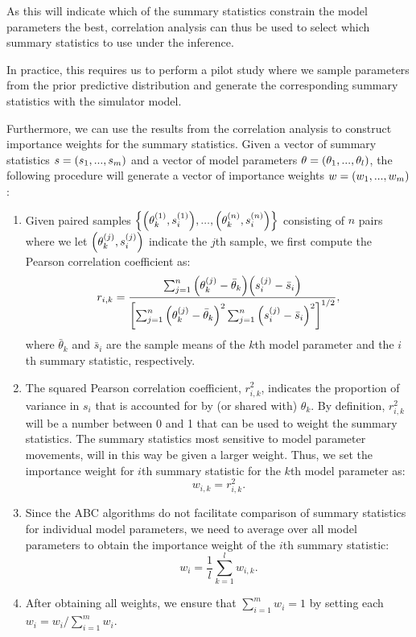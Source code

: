 As this will indicate which of the summary statistics constrain the model parameters the best, correlation analysis can thus be used to select which summary statistics to use under the inference. %

In practice, this requires us to perform a pilot study where we sample parameters from the prior predictive distribution and generate the corresponding summary statistics with the simulator model.  

Furthermore, we can use the results from the correlation analysis to construct importance weights for the summary statistics. Given a vector of summary statistics $s = \qty(s_1, ..., s_m)$ and a vector of model parameters $\theta = \qty(\theta_1, ..., \theta_l)$, the following procedure will generate a vector of importance weights $w = \qty(w_1, ..., w_m)$: 
\begin{enumerate}
    \item Given paired samples $\qty{\qty(\theta_k^{(1)}, s_i^{(1)}), ..., \qty(\theta_k^{(n)}, s_i^{(n)})}$ consisting of $n$ pairs where we let $\qty(\theta_k^{(j)}, s_i^{(j)})$ indicate the $j$th sample, we first compute the Pearson correlation coefficient as:
    \begin{equation*}
    r_{i, k} = \frac{\sum_{j=1}^n \qty(\theta_k^{(j)} - \bar{\theta}_k) \qty(s_i^{(j)} - \bar{s}_i)}{\qty[\sum_{j=1}^n \qty(\theta_k^{(j)} - \bar{\theta}_k )^2 \sum_{j=1}^n \qty(s_i^{(j)} - \bar{s}_i )^2 ]^{1/2}},
    \end{equation*}
    where $\bar{\theta}_k$ and $\bar{s}_i$ are the sample means of the $k$th model parameter and the $i$th summary statistic, respectively.
    \item The squared Pearson correlation coefficient, $r_{i,k}^2$, indicates the proportion of variance in $s_{i}$ that is accounted for by (or shared with) $\theta_k$. By definition, $r_{i,k}^2$ will be a number between 0 and 1 that can be used to weight the summary statistics. The summary statistics most sensitive to model parameter movements, will in this way be given a larger weight. Thus, we set the importance weight for $i$th summary statistic for the $k$th model parameter as:
    \begin{equation*}
        w_{i, k} = r_{i, k}^2.
    \end{equation*}
    \item Since the ABC algorithms do not facilitate comparison of summary statistics for individual model parameters, we need to average over all model parameters to obtain the importance weight of the $i$th summary statistic:
    \begin{equation*}
        w_i = \frac{1}{l} \sum_{k=1}^l w_{i, k}.
    \end{equation*}
    \item After obtaining all weights, we ensure that $\sum_{i=1}^m w_i = 1$ by setting each $w_i = w_i / \sum_{i=1}^m w_i$.
\end{enumerate} 




